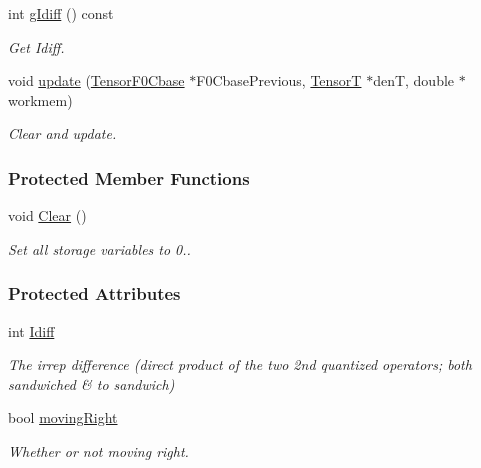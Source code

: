 \begin{DoxyCompactItemize}
int \hyperlink{classCheMPS2_1_1TensorF0Cbase_a9a2faf3c815b86c05dbbe77e06ed50a4}{g\-Idiff} () const 
\begin{DoxyCompactList}\small\item\em Get Idiff. \end{DoxyCompactList}\item 
void \hyperlink{classCheMPS2_1_1TensorF0Cbase_a901bfd9cee6af125f30ee89902b9ccd3}{update} (\hyperlink{classCheMPS2_1_1TensorF0Cbase}{Tensor\-F0\-Cbase} $\ast$F0\-Cbase\-Previous, \hyperlink{classCheMPS2_1_1TensorT}{Tensor\-T} $\ast$den\-T, double $\ast$workmem)
\begin{DoxyCompactList}\small\item\em Clear and update. \end{DoxyCompactList}\end{DoxyCompactItemize}
\subsubsection*{Protected Member Functions}
\begin{DoxyCompactItemize}
\item 
\hypertarget{classCheMPS2_1_1TensorF0Cbase_a91c0fd968855fe1df516828aa265680c}{void \hyperlink{classCheMPS2_1_1TensorF0Cbase_a91c0fd968855fe1df516828aa265680c}{Clear} ()}\label{classCheMPS2_1_1TensorF0Cbase_a91c0fd968855fe1df516828aa265680c}

\begin{DoxyCompactList}\small\item\em Set all storage variables to 0.. \end{DoxyCompactList}\end{DoxyCompactItemize}
\subsubsection*{Protected Attributes}
\begin{DoxyCompactItemize}
\item 
\hypertarget{classCheMPS2_1_1TensorF0Cbase_a932e8e90a71abde492abcfd2ac10e2bc}{int \hyperlink{classCheMPS2_1_1TensorF0Cbase_a932e8e90a71abde492abcfd2ac10e2bc}{Idiff}}\label{classCheMPS2_1_1TensorF0Cbase_a932e8e90a71abde492abcfd2ac10e2bc}

\begin{DoxyCompactList}\small\item\em The irrep difference (direct product of the two 2nd quantized operators; both sandwiched \& to sandwich) \end{DoxyCompactList}\item 
\hypertarget{classCheMPS2_1_1TensorF0Cbase_a95880e54483e1f1be5c637d51a89f929}{bool \hyperlink{classCheMPS2_1_1TensorF0Cbase_a95880e54483e1f1be5c637d51a89f929}{moving\-Right}}\label{classCheMPS2_1_1TensorF0Cbase_a95880e54483e1f1be5c637d51a89f929}

\begin{DoxyCompactList}\small\item\em Whether or not moving right. \end{DoxyCompactList}\end{DoxyCompactItemize}


